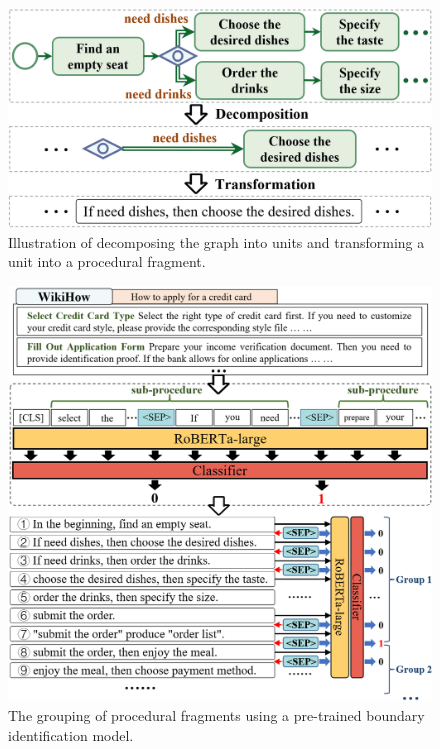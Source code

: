 \begin{figure}[t]
    \centering
    \includegraphics[width=1\linewidth]{figures/dataset/DatasetConstruction_1.png}

    \caption{Illustration of decomposing the graph into units and transforming a unit into a procedural fragment.
    }
    \label{fig:Decomposition}

\end{figure}
\vspace{5pt}

\begin{figure}[t]
    \centering
    \includegraphics[width=1\linewidth]{figures/dataset/DatasetConstruction_2.png}

    \caption{The grouping of procedural fragments using a pre-trained boundary identification model.}
    \label{fig:Grouping_Ordering}

\end{figure}
\vspace{5pt}

